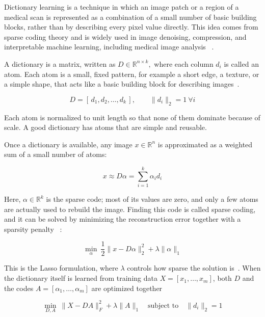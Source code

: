 Dictionary learning is a technique in which an image patch or a region of a medical scan is represented as a combination of a small number of basic building blocks,
rather than by describing every pixel value directly. This idea comes from sparse coding theory and is widely used in image denoising, compression,
and interpretable machine learning, including medical image analysis~\cite{9577340} \cite{LI2016298}.


A dictionary is a matrix, written as $D \in \mathbb{R}^{n \times k},$ where each column $d_i$ is called an atom. Each atom is a small, fixed pattern,
for example a short edge, a texture, or a simple shape, that acts like a basic building block for describing images~\cite{9577340}.

\begin{equation}[Dictionary Definition]
D = [\,d_1, d_2, \dots, d_k\,], \qquad \|d_i\|_2 = 1 \ \forall i
\end{equation}

Each atom is normalized to unit length so that none of them dominate because of scale. A good dictionary has atoms that are simple and reusable.


Once a dictionary is available, any image $x \in \mathbb{R}^n$ is approximated as a weighted sum of a small number of atoms:

\begin{equation}[Sparse Image Reconstruction]
x \approx D\alpha = \sum_{i=1}^{k} \alpha_i d_i
\end{equation}

Here, $\alpha \in \mathbb{R}^k$ is the sparse code; most of its values are zero, and only a few atoms are actually used to rebuild the image.
Finding this code is called sparse coding, and it can be solved by minimizing the reconstruction error together with a sparsity penalty~\cite{LI2016298} \cite{NIPS2006_2d71b2ae}:

\begin{equation}[Lasso Sparse Coding Objective]
\min_{\alpha} \ \frac{1}{2}\|x - D\alpha\|_2^2 + \lambda \|\alpha\|_1
\end{equation}

This is the Lasso formulation, where $\lambda$ controls how sparse the solution is~\cite{1710377}.
When the dictionary itself is learned from training data $X = [x_1, \dots, x_m]$, both $D$ and the codes $A = [\alpha_1, \dots, \alpha_m]$ are optimized together

\begin{equation}[Joint Dictionary and Code Learning]
\min_{D, A} \ \|X - DA\|_F^2 + \lambda \|A\|_1 \quad \text{subject to} \quad \|d_i\|_2 = 1
\end{equation}


